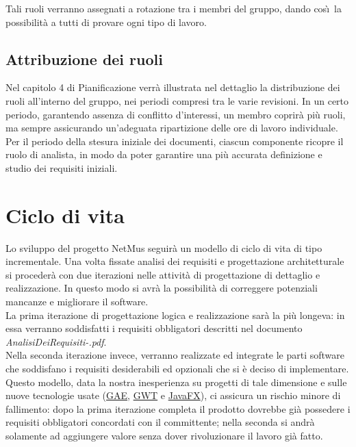 Tali ruoli verranno assegnati a rotazione tra i membri del gruppo, dando
cos\`\i\ la possibilit\`a a tutti di provare ogni tipo di lavoro.

\section{Attribuzione dei ruoli}
Nel capitolo 4 di Pianificazione verr\`a illustrata nel dettaglio la distribuzione dei ruoli
all'interno del gruppo, nei periodi compresi tra le varie revisioni.
In un certo periodo, garantendo assenza di conflitto d'interessi, un membro
coprir\`a pi\`u ruoli, ma sempre assicurando un'adeguata ripartizione delle ore
di lavoro individuale.\\

Per il periodo della stesura iniziale dei documenti, ciascun
componente ricopre il ruolo di analista, in modo da poter garantire una pi\`u
accurata definizione e studio dei requisiti iniziali.

\chapter{Ciclo di vita}
\thispagestyle{fancy}
Lo sviluppo del progetto NetMus seguir\`a un modello di ciclo di vita
di tipo incrementale. Una volta fissate analisi dei
requisiti e progettazione architetturale si proceder\`a con due iterazioni nelle
attivit\`a di progettazione di dettaglio e realizzazione. In questo modo si
avr\`a la possibilit\`a di correggere potenziali mancanze e migliorare il
software.\\
La prima iterazione di progettazione logica e realizzazione sar\`a la pi\`u
longeva: in essa verranno soddisfatti i requisiti obbligatori descritti nel
documento \emph{AnalisiDeiRequisiti-\versioneAR.pdf}.\\
Nella seconda iterazione invece, verranno realizzate ed integrate le parti
software che soddisfano i requisiti desiderabili ed opzionali che si \`e deciso
di implementare.\\

Questo modello, data la nostra inesperienza su progetti di tale dimensione e
sulle nuove tecnologie usate (\underline{GAE}, \underline{GWT} e
\underline{JavaFX}), ci assicura un rischio minore di fallimento: dopo la prima iterazione completa il prodotto dovrebbe
gi\`a possedere i requisiti obbligatori concordati con il committente; nella
seconda si andr\`a solamente ad aggiungere valore senza dover rivoluzionare il
lavoro gi\`a fatto.\\

